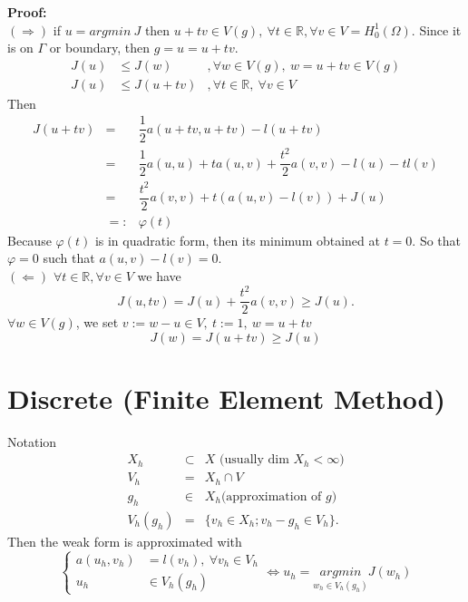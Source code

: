 \documentclass[]{report}
\begin{document}
\textbf{Proof:}\\
$ (\Rightarrow) $ if $ u = argmin \ J $ then $ u+tv \in V(g) , \ \forall t \in \mathbb{R}, \forall v \in V = H_{0}^{1} (\Omega) $. Since it is on $ \Gamma $ or boundary, then $ g=u=u+tv $.
\begin{eqnarray}\nonumber
J(u) &\leq J(w) &, \forall w \in V(g), \ w=u+tv \in V(g)\\ \nonumber
J(u) &\leq J(u+tv) &, \forall t \in \mathbb{R}, \ \forall v \in V
\end{eqnarray}
Then
\begin{eqnarray}\nonumber
J(u+tv) &=& \dfrac{1}{2} a(u+tv,u+tv)-l(u+tv)\\ \nonumber
&=& \dfrac{1}{2} a(u,u) + t a(u,v) + \dfrac{t^2}{2} a (v,v) - l(u) - t l(v)\\ \nonumber
&=& \dfrac{t^2}{2} a (v,v) + t (a(u,v) - l(v)) + J(u)\\ \nonumber
&=:& \varphi(t)
\end{eqnarray}
Because $ \varphi(t) $ is in quadratic form, then its minimum obtained at $ t=0 $. So that $ \varphi =0 $ such that $ a(u,v) - l(v) =0 $.\\
$ (\Leftarrow) $ $ \forall t \in \mathbb{R}, \forall v \in V $ we have
\begin{equation}\nonumber
J(u,tv) = J(u) + \dfrac{t^2}{2} a(v,v) \geq J(u).
\end{equation}
$ \forall w \in V(g) $, we set $ v := w -u \in V , \ t:=1 , \ w=u+tv $
\begin{equation}\nonumber
J(w) = J(u+tv) \geq J(u)
\end{equation}

\section{Discrete (Finite Element Method)}
Notation
\begin{eqnarray}\nonumber
X_{h} &\subset & X \text{ (usually dim } X_{h} < \infty \text{)} \\ \nonumber
V_{h} & = & X_{h} \cap V\\ \nonumber
g_{h} & \in & X_{h} \text{(approximation of } g \text{)} \\ \nonumber
V_{h}(g_{h}) & = & \{ v_{h} \in X_{h} ; v_{h}-g_{h} \in V_{h} \}.
\end{eqnarray}
Then the weak form is approximated with
\begin{equation} \nonumber
\begin{cases}
a(u_{h}, v_{h}) &= l(v_{h}), \ \forall v_{h} \in V_{h} \\
u_{h} &\in V_{h}(g_{h})
\end{cases}
\iff u_{h} = \underset{w_{h} \in V_{h}(g_{h})}{argmin}J(w_{h})
\end{equation}
\end{document}
